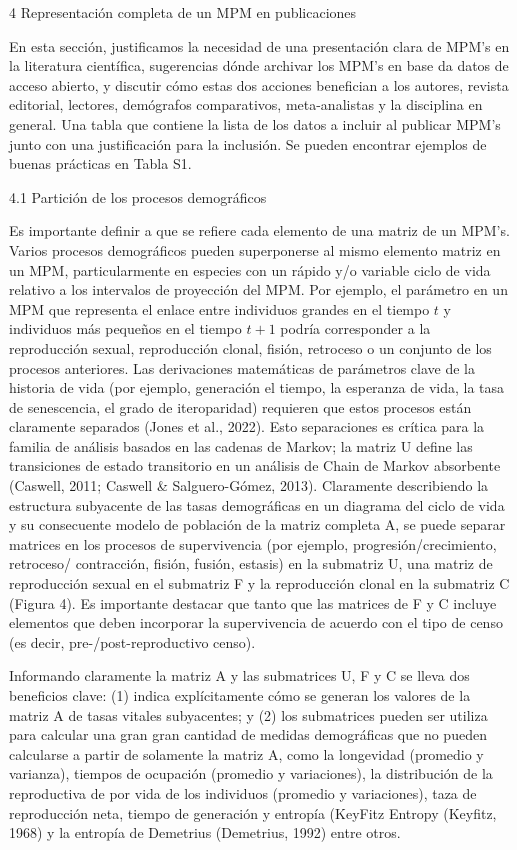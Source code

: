 \documentclass[
  12pt,
  letterpaper,
]{book}
\begin{document}
4 \textbar{} Representación completa de un MPM en publicaciones

En esta sección, justificamos la necesidad de una presentación clara de
MPM's en la literatura científica, sugerencias dónde archivar los MPM's
en base da datos de acceso abierto, y discutir cómo estas dos acciones
benefician a los autores, revista editorial, lectores, demógrafos
comparativos, meta-analistas y la disciplina en general. Una tabla que
contiene la lista de los datos a incluir al publicar MPM's junto con una
justificación para la inclusión. Se pueden encontrar ejemplos de buenas
prácticas en Tabla S1.

4.1 \textbar{} Partición de los procesos demográficos

Es importante definir a que se refiere cada elemento de una matriz de un
MPM's. Varios procesos demográficos pueden superponerse al mismo
elemento matriz en un MPM, particularmente en especies con un rápido y/o
variable ciclo de vida relativo a los intervalos de proyección del MPM.
Por ejemplo, el parámetro en un MPM que representa el enlace entre
individuos grandes en el tiempo \(t\) y individuos más pequeños en el
tiempo \(t+1\) podría corresponder a la reproducción sexual,
reproducción clonal, fisión, retroceso o un conjunto de los procesos
anteriores. Las derivaciones matemáticas de parámetros clave de la
historia de vida (por ejemplo, generación el tiempo, la esperanza de
vida, la tasa de senescencia, el grado de iteroparidad) requieren que
estos procesos están claramente separados (Jones et al., 2022). Esto
separaciones es crítica para la familia de análisis basados en las
cadenas de Markov; la matriz U define las transiciones de estado
transitorio en un análisis de Chain de Markov absorbente (Caswell, 2011;
Caswell \& Salguero-Gómez, 2013). Claramente describiendo la estructura
subyacente de las tasas demográficas en un diagrama del ciclo de vida y
su consecuente modelo de población de la matriz completa A, se puede
separar matrices en los procesos de supervivencia (por ejemplo,
progresión/crecimiento, retroceso/ contracción, fisión, fusión, estasis)
en la submatriz U, una matriz de reproducción sexual en el submatriz F y
la reproducción clonal en la submatriz C (Figura 4). Es importante
destacar que tanto que las matrices de F y C incluye elementos que deben
incorporar la supervivencia de acuerdo con el tipo de censo (es decir,
pre-/post-reproductivo censo).

Informando claramente la matriz A y las submatrices U, F y C se lleva
dos beneficios clave: (1) indica explícitamente cómo se generan los
valores de la matriz A de tasas vitales subyacentes; y (2) los
submatrices pueden ser utiliza para calcular una gran gran cantidad de
medidas demográficas que no pueden calcularse a partir de solamente la
matriz A, como la longevidad (promedio y varianza), tiempos de ocupación
(promedio y variaciones), la distribución de la reproductiva de por vida
de los individuos (promedio y variaciones), taza de reproducción neta,
tiempo de generación y entropía (KeyFitz Entropy (Keyfitz, 1968) y la
entropía de Demetrius (Demetrius, 1992) entre otros.
\end{document}
